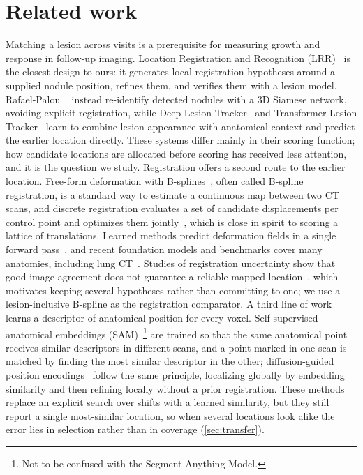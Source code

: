 \section{Related work}
\label{sec:related}
Matching a lesion across visits is a prerequisite for measuring growth and response in follow-up imaging.
Location Registration and Recognition (LRR)~\cite{sofka2010} is the closest design to ours: it generates local registration hypotheses around a supplied nodule position, refines them, and verifies them with a lesion model.
Rafael-Palou \etal~\cite{rafaelpalou2021} instead re-identify detected nodules with a 3D Siamese network, avoiding explicit registration, while Deep Lesion Tracker~\cite{cai2021} and Transformer Lesion Tracker~\cite{tang2022tlt} learn to combine lesion appearance with anatomical context and predict the earlier location directly.
These systems differ mainly in their scoring function; how candidate locations are allocated before scoring has received less attention, and it is the question we study.
Registration offers a second route to the earlier location.
Free-form deformation with B-splines~\cite{rueckert1999}, often called B-spline registration, is a standard way to estimate a continuous map between two CT scans, and discrete registration evaluates a set of candidate displacements per control point and optimizes them jointly~\cite{glocker2008dense,heinrich2013mrf}, which is close in spirit to scoring a lattice of translations.
Learned methods predict deformation fields in a single forward pass~\cite{balakrishnan2019voxelmorph,ghazipour20213}, and recent foundation models and benchmarks cover many anatomies, including lung CT~\cite{tian2024unigradicon,hering2023learn2reg}.
Studies of registration uncertainty show that good image agreement does not guarantee a reliable mapped location~\cite{eppenhof2018,luo2017}, which motivates keeping several hypotheses rather than committing to one; we use a lesion-inclusive B-spline as the registration comparator.
A third line of work learns a descriptor of anatomical position for every voxel.
Self-supervised anatomical embeddings (SAM)~\cite{yan2022sam}\footnote{Not to be confused with the Segment Anything Model.} are trained so that the same anatomical point receives similar descriptors in different scans, and a point marked in one scan is matched by finding the most similar descriptor in the other; diffusion-guided position encodings~\cite{zhuang2026diffusion} follow the same principle, localizing globally by embedding similarity and then refining locally without a prior registration.
These methods replace an explicit search over shifts with a learned similarity, but they still report a single most-similar location, so when several locations look alike the error lies in selection rather than in coverage (\cref{sec:transfer}).
